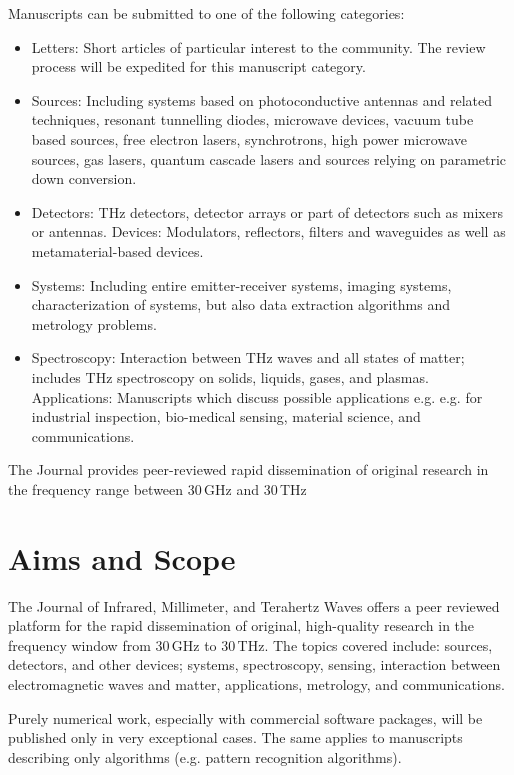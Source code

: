 \documentclass[smallextended]{svjour3}
\begin{document}
Manuscripts can be submitted to one of the following categories:
\begin{itemize}
    \item Letters: Short articles of particular interest to the community. The review process will be expedited for this manuscript category.
    
    \item Sources: Including systems based on photoconductive antennas and related techniques, resonant tunnelling diodes, microwave devices, vacuum tube based sources, free electron lasers, synchrotrons, high power microwave sources, gas lasers, quantum cascade lasers and sources relying on parametric down conversion.
    
    \item Detectors: THz detectors, detector arrays or part of detectors such as mixers or antennas.
    Devices: Modulators, reflectors, filters and waveguides as well as metamaterial-based devices.
    
    \item Systems: Including entire emitter-receiver systems, imaging systems, characterization of systems, but also data extraction algorithms and metrology problems.
    
    \item Spectroscopy: Interaction between THz waves and all states of matter; includes THz spectroscopy on solids, liquids, gases, and plasmas.
    Applications: Manuscripts which discuss possible applications e.g. e.g. for industrial inspection, bio-medical sensing, material science, and communications.
    
\end{itemize}
The Journal provides peer-reviewed rapid dissemination of original research in the frequency range between 30\,GHz and 30\,THz

\section{Aims and Scope}

The Journal of Infrared, Millimeter, and Terahertz Waves offers a peer reviewed platform for the rapid dissemination of original, high-quality research in the frequency window from 30\,GHz to 30\,THz. The topics covered include: sources, detectors, and other devices; systems, spectroscopy, sensing, interaction between electromagnetic waves and matter, applications, metrology, and communications.

Purely numerical work, especially with commercial software packages, will be published only in very exceptional cases. The same applies to manuscripts describing only algorithms (e.g. pattern recognition algorithms).
\end{document}
